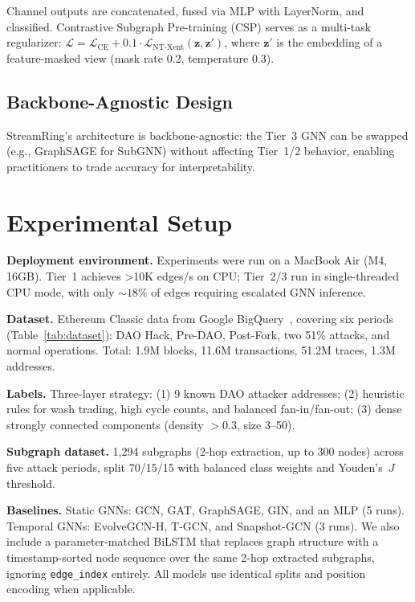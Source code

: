 \documentclass[sigconf, anonymous, review]{acmart}
\begin{document}
Channel outputs are concatenated, fused via MLP with LayerNorm, and classified. Contrastive Subgraph Pre-training (CSP) serves as a multi-task regularizer: $\mathcal{L} = \mathcal{L}_{\text{CE}} + 0.1 \cdot \mathcal{L}_{\text{NT-Xent}}(\mathbf{z}, \mathbf{z}')$, where $\mathbf{z}'$ is the embedding of a feature-masked view (mask rate 0.2, temperature 0.3).

\subsection{Backbone-Agnostic Design}

StreamRing's architecture is backbone-agnostic: the Tier~3 GNN can be swapped (e.g., GraphSAGE for SubGNN) without affecting Tier~1/2 behavior, enabling practitioners to trade accuracy for interpretability.

\section{Experimental Setup}
\label{sec:setup}

\textbf{Deployment environment.} Experiments were run on a MacBook Air (M4, 16GB). Tier~1 achieves {>}10K edges/s on CPU; Tier~2/3 run in single-threaded CPU mode, with only $\sim18\%$ of edges requiring escalated GNN inference.

\textbf{Dataset.} Ethereum Classic data from Google BigQuery~\cite{ethereum_classic_kaggle}, covering six periods (Table~\ref{tab:dataset}): DAO Hack, Pre-DAO, Post-Fork, two 51\% attacks, and normal operations. Total: 1.9M blocks, 11.6M transactions, 51.2M traces, 1.3M addresses.

\textbf{Labels.} Three-layer strategy: (1) 9 known DAO attacker addresses; (2) heuristic rules for wash trading, high cycle counts, and balanced fan-in/fan-out; (3) dense strongly connected components (density $>$0.3, size 3--50).

\textbf{Subgraph dataset.} 1,294 subgraphs (2-hop extraction, up to 300 nodes) across five attack periods, split 70/15/15 with balanced class weights and Youden's~$J$ threshold.

\textbf{Baselines.} Static GNNs: GCN, GAT, GraphSAGE, GIN, and an MLP (5 runs). Temporal GNNs: EvolveGCN-H, T-GCN, and Snapshot-GCN (3 runs). We also include a parameter-matched BiLSTM \cite{hochreiter1997lstm,graves2005bilstm} that replaces graph structure with a timestamp-sorted node sequence over the same 2-hop extracted subgraphs, ignoring \texttt{edge\_index} entirely. All models use identical
splits and position encoding when applicable.
\end{document}

